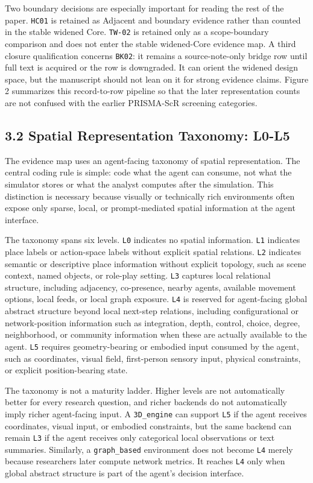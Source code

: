 \documentclass[
  twocolumn]{article}
\begin{document}
Two boundary decisions are especially important for reading the rest of
the paper. \texttt{HC01} is retained as Adjacent and boundary evidence
rather than counted in the stable widened Core. \texttt{TW-02} is
retained only as a scope-boundary comparison and does not enter the
stable widened-Core evidence map. A third closure qualification concerns
\texttt{BK02}: it remains a source-note-only bridge row until full text
is acquired or the row is downgraded. It can orient the widened design
space, but the manuscript should not lean on it for strong evidence
claims. Figure 2 summarizes this record-to-row pipeline so that the
later representation counts are not confused with the earlier PRISMA-ScR
screening categories.

\subsection{3.2 Spatial Representation Taxonomy:
L0-L5}\label{spatial-representation-taxonomy-l0-l5}

The evidence map uses an agent-facing taxonomy of spatial
representation. The central coding rule is simple: code what the agent
can consume, not what the simulator stores or what the analyst computes
after the simulation. This distinction is necessary because visually or
technically rich environments often expose only sparse, local, or
prompt-mediated spatial information at the agent interface.

The taxonomy spans six levels. \texttt{L0} indicates no spatial
information. \texttt{L1} indicates place labels or action-space labels
without explicit spatial relations. \texttt{L2} indicates semantic or
descriptive place information without explicit topology, such as scene
context, named objects, or role-play setting. \texttt{L3} captures local
relational structure, including adjacency, co-presence, nearby agents,
available movement options, local feeds, or local graph exposure.
\texttt{L4} is reserved for agent-facing global abstract structure
beyond local next-step relations, including configurational or
network-position information such as integration, depth, control,
choice, degree, neighborhood, or community information when these are
actually available to the agent. \texttt{L5} requires geometry-bearing
or embodied input consumed by the agent, such as coordinates, visual
field, first-person sensory input, physical constraints, or explicit
position-bearing state.

The taxonomy is not a maturity ladder. Higher levels are not
automatically better for every research question, and richer backends do
not automatically imply richer agent-facing input. A \texttt{3D\_engine}
can support \texttt{L5} if the agent receives coordinates, visual input,
or embodied constraints, but the same backend can remain \texttt{L3} if
the agent receives only categorical local observations or text
summaries. Similarly, a \texttt{graph\_based} environment does not
become \texttt{L4} merely because researchers later compute network
metrics. It reaches \texttt{L4} only when global abstract structure is
part of the agent's decision interface.
\end{document}
